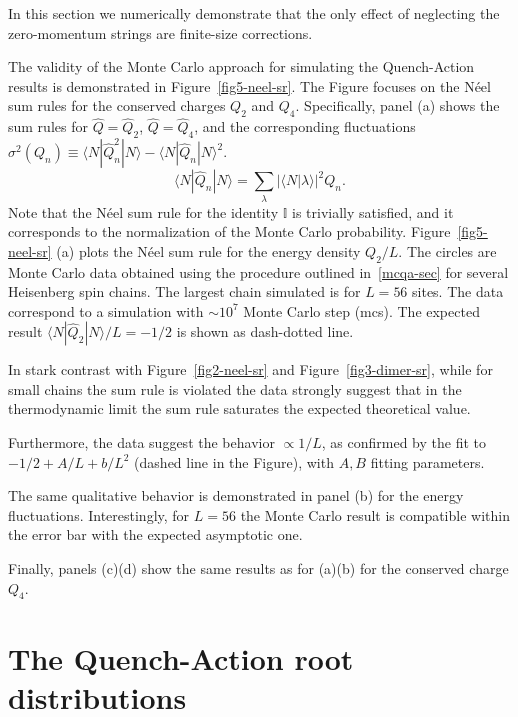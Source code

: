 \documentclass[11pt]{iopart}
\begin{document}
In this section we numerically demonstrate that the only effect of neglecting 
the zero-momentum strings are finite-size corrections. 

The validity of the Monte Carlo approach for simulating the Quench-Action 
results is demonstrated in Figure~\ref{fig5-neel-sr}. The Figure focuses on 
the N\'eel sum rules for the conserved charges $Q_2$ and $Q_4$. Specifically, 
panel (a) shows the sum rules for $\hat Q=\hat Q_2$, $\hat Q=\hat Q_4$, 
and the corresponding fluctuations $\sigma^2(Q_n)\equiv \langle N|\hat Q_n^2|
N\rangle-\langle N|\hat Q_n|N\rangle^2$. 
%
\begin{equation}
\langle N|\hat Q_n|N\rangle=\sum\limits_{\lambda}|\langle N|\lambda\rangle|^2
Q_n.
\end{equation}
%
Note that the N\'eel sum rule for the identity $\mathbb{I}$ is trivially satisfied, 
and it corresponds to the normalization of the Monte Carlo probability. 
Figure~\ref{fig5-neel-sr} (a) plots the N\'eel sum rule for the energy density $Q_2/L$. 
The circles are Monte Carlo data obtained using the procedure outlined in~\ref{mcqa-sec} 
for several Heisenberg spin chains. The largest chain simulated is for $L=56$ sites. 
The data correspond to a simulation with $\sim 10^7$ Monte Carlo step (mcs). 
The expected result $\langle N|\hat Q_2|N\rangle/L=-1/2$ is shown as dash-dotted 
line. 

In stark contrast with Figure~\ref{fig2-neel-sr} and Figure~\ref{fig3-dimer-sr}, 
while for small chains the sum rule is violated the data strongly suggest that 
in the thermodynamic limit the sum rule saturates the expected theoretical 
value. 

Furthermore, the data suggest the behavior $\propto 1/L$, as confirmed by the fit 
to $-1/2+A/L+b/L^2$ (dashed line in the Figure), with $A,B$ fitting parameters. 

The same qualitative behavior is demonstrated in panel (b) for the energy 
fluctuations. Interestingly, for $L=56$ the Monte Carlo result is compatible 
within the error bar with the expected asymptotic one. 

Finally, panels (c)(d) show the same results as for (a)(b) for the conserved 
charge $Q_4$. 

\section{The Quench-Action root distributions}
\label{MCQA-root}
\end{document}

